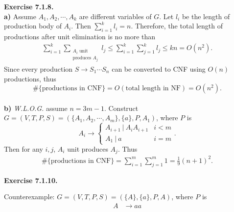 \documentclass[a4paper]{article}
\newenvironment{exercise}[1]{
	\par
	\noindent\textbf{Exercise #1.}\quad
}{
	\par
	\bigskip
}
\newcommand{\dv}{\ |\ }
\begin{document}
\begin{exercise}{7.1.8} \hspace{0pt}\\
\textbf{a)}
        Assume $A_1,A_2,\cdots,A_k$ are different variables of $G$.
        Let $l_i$ be the length of production body of $A_i$.
        Then $\sum_{i=1}^k l_i=n$. Therefore, the total length of productions after unit elimination is
        no more than
        \begin{align*}
            \sum_{i=1}^k \sum_{\substack{A_i\text{ unit}\\\text{produces }A_j}} l_j
            \leqslant \sum_{i=1}^k \sum_{j=1}^k l_j\leqslant kn=O(n^2).
        \end{align*}
        Since every production $S\to S_1\cdots S_n$ can be converted to CNF using $O(n)$ productions,
        thus
        $$
        \#\{\text{productions in CNF}\}=O(\text{total length in NF})=O(n^2).
        $$\\
\textbf{b)} \textit{W.L.O.G.} assume $n=3m-1$.
    Construct $G=(V,T,P,S)=(\{A_1,A_2,\cdots,A_{m}\},\{a\},P,A_1)$, where $P$ is
    $$
        A_i\to\begin{cases}
            A_{i+1}\dv A_{i}A_{i+1} & i<m\\
            A_1\dv a & i=m
        \end{cases}.
    $$
    Then for any $i,j$, $A_i$ unit produces $A_j$. Thus
    \begin{align*}
        \#\{\text{productions in CNF}\}= \sum_{i=1}^{m} \sum_{j=1}^{m} 1=\frac19 (n+1)^2.
    \end{align*}
\end{exercise}

\begin{exercise}{7.1.10}
    Counterexample: $G=(V,T,P,S)=(\{A\},\{a\},P,A)$, where $P$ is
    \begin{align*}
        A&\to aa
    \end{align*}
\end{exercise}
\end{document}
